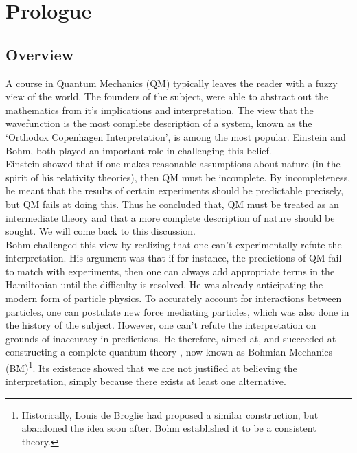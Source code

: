 %

\chapter{Prologue}


\section{Overview}

A course in Quantum Mechanics (QM) typically leaves the reader with
a fuzzy view of the world. The founders of the subject, were able
to abstract out the mathematics from it's implications and interpretation.
The view that the wavefunction is the most complete description of
a system, known as the `Orthodox Copenhagen Interpretation', is among
the most popular. Einstein and Bohm, both played an important role
in challenging this belief. \\
Einstein showed \cite{EinsteinEPR} that if one makes reasonable assumptions
about nature (in the spirit of his relativity theories), then QM must
be incomplete. By incompleteness, he meant that the results of certain
experiments should be predictable precisely, but QM fails at doing
this. Thus he concluded that, QM must be treated as an intermediate
theory and that a more complete description of nature should be sought.
We will come back to this discussion. \\
Bohm challenged this view by realizing that one can't experimentally
refute the interpretation. His argument was that if for instance,
the predictions of QM fail to match with experiments, then one can
always add appropriate terms in the Hamiltonian until the difficulty
is resolved. He was already anticipating the modern form of particle
physics. To accurately account for interactions between particles,
one can postulate new force mediating particles, which was also done
in the history of the subject. However, one can't refute the interpretation
on grounds of inaccuracy in predictions. He therefore, aimed at, and
succeeded at constructing a complete quantum theory \cite{Bohm1},
now known as Bohmian Mechanics (BM)\footnote{Historically, Louis de Broglie had proposed a similar construction,
but abandoned the idea soon after. Bohm established it to be a consistent
theory.}. Its existence showed that we are not justified at believing the
interpretation, simply because there exists at least one alternative.

